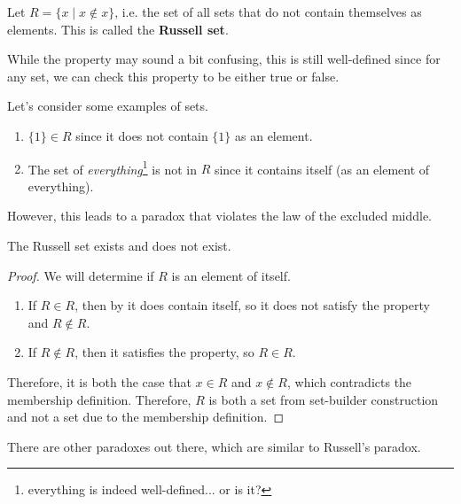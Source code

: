 \begin{definition}
  Let $R = \{x \mid x \not\in x\}$, i.e. the set of all sets that do not contain themselves as elements. This is called the \textbf{Russell set}. 
\end{definition}

While the property may sound a bit confusing, this is still well-defined since for any set, we can check this property to be either true or false. 

\begin{example}
  Let's consider some examples of sets. 
  \begin{enumerate}
    \item $\{1\} \in R$ since it does not contain $\{1\}$ as an element. 
    \item The set of \textit{everything}\footnote{everything is indeed well-defined... or is it?} is not in $R$ since it contains itself (as an element of everything). 
  \end{enumerate}
\end{example}

However, this leads to a paradox that violates the law of the excluded middle. 

\begin{theorem} 
  The Russell set exists and does not exist. 
\end{theorem}
\begin{proof}
  We will determine if $R$ is an element of itself. 
  \begin{enumerate}
    \item If $R \in R$, then by it does contain itself, so it does not satisfy the property and $R \not\in R$. 
    \item If $R \not\in R$, then it satisfies the property, so $R \in R$. 
  \end{enumerate}
  Therefore, it is both the case that $x \in R$ and $x \not\in R$, which contradicts the membership definition. Therefore, $R$ is both a set from set-builder construction and not a set due to the membership definition. 
\end{proof}

There are other paradoxes out there, which are similar to Russell's paradox. 

